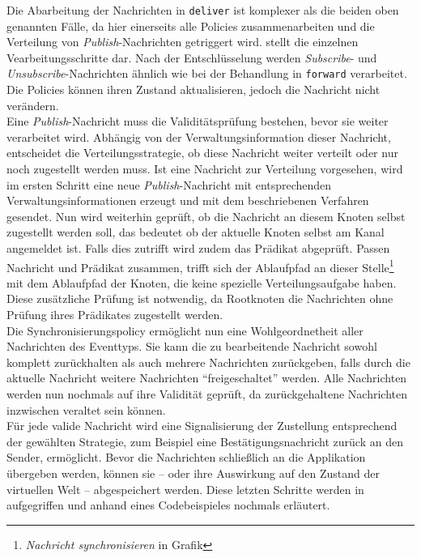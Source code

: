 Die Abarbeitung der Nachrichten in \texttt{deliver} ist komplexer als die beiden oben genannten Fälle, da hier einerseits alle Policies zusammenarbeiten und die Verteilung von \emph{Publish}-Nachrichten getriggert wird.  stellt die einzelnen Vearbeitungsschritte dar. Nach der Entschlüsselung werden \emph{Subscribe}- und \emph{Unsubscribe}-Nachrichten ähnlich wie bei der Behandlung in \texttt{forward} verarbeitet. Die Policies können ihren Zustand aktualisieren, jedoch die Nachricht nicht verändern.\\
Eine \emph{Publish}-Nachricht muss die Validitätsprüfung bestehen, bevor sie weiter verarbeitet wird. Abhängig von der Verwaltungsinformation dieser Nachricht, entscheidet die Verteilungsstrategie, ob diese Nachricht weiter verteilt oder nur noch zugestellt werden muss. Ist eine Nachricht zur Verteilung vorgesehen, wird im ersten Schritt eine neue \emph{Publish}-Nachricht mit entsprechenden Verwaltungsinformationen erzeugt und mit dem beschriebenen Verfahren gesendet. Nun wird weiterhin geprüft, ob die Nachricht an diesem Knoten selbst zugestellt werden soll, das bedeutet ob der aktuelle Knoten selbst am Kanal angemeldet ist. Falls dies zutrifft wird zudem das Prädikat abgeprüft. Passen Nachricht und Prädikat zusammen, trifft sich der Ablaufpfad an dieser Stelle\footnote{\emph{Nachricht synchronisieren} in Grafik } mit dem Ablaufpfad der Knoten, die keine spezielle Verteilungsaufgabe haben. Diese zusätzliche Prüfung ist notwendig, da Rootknoten die Nachrichten ohne Prüfung ihres Prädikates zugestellt werden.\\
Die Synchronisierungspolicy ermöglicht nun eine Wohlgeordnetheit aller Nachrichten des Eventtyps. Sie kann die zu bearbeitende Nachricht sowohl komplett zurückhalten als auch mehrere Nachrichten zurückgeben, falls durch die aktuelle Nachricht weitere Nachrichten \enquote{freigeschaltet} werden. Alle Nachrichten werden nun nochmals auf ihre Validität geprüft, da zurückgehaltene Nachrichten inzwischen veraltet sein können.\\
Für jede valide Nachricht wird eine Signalisierung der Zustellung entsprechend der gewählten Strategie, zum Beispiel eine Bestätigungsnachricht zurück an den Sender, ermöglicht. Bevor die Nachrichten schließlich an die Applikation übergeben werden, können sie -- oder ihre Auswirkung auf den Zustand der virtuellen Welt -- abgespeichert werden. Diese letzten Schritte werden in  aufgegriffen und anhand eines Codebeispieles nochmals erläutert.


